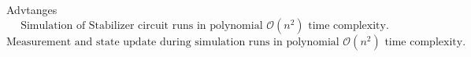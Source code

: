 \begin{frame}{Advtanges}
    \[
        \text{Simulation of Stabilizer circuit runs in polynomial }
        \mathcal{O}\left(n^2\right)
        \text{ time complexity.}
    \]
    \[
        \text{Measurement and state update during simulation runs in polynomial }
        \mathcal{O}\left(n^2\right)
        \text{ time complexity.}
    \]
\end{frame}
